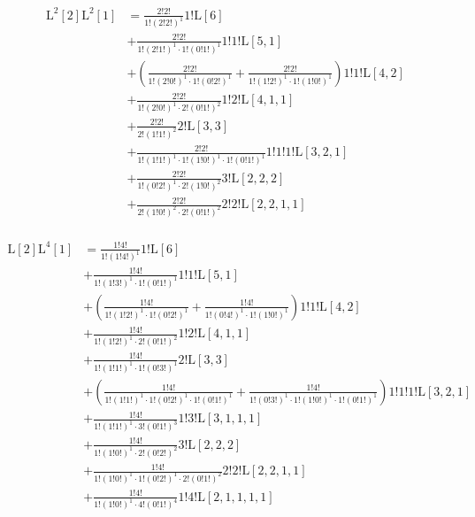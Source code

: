 \begin{equation*} \begin{aligned}
  \mathrm{L}^2[2] \mathrm{L}^2[1] &=
  \frac{2!2!}{1!(2!2!)^1}
  1! \mathrm{L}[6] \\ &
+ \frac{2!2!}{1!(2!1!)^1 \cdot 1!(0!1!)^1}
  1!1! \mathrm{L}[5, 1] \\ &
+ \left(
  \frac{2!2!}{1!(2!0!)^1 \cdot 1!(0!2!)^1}
+ \frac{2!2!}{1!(1!2!)^1 \cdot 1!(1!0!)^1}
  \right)
  1!1! \mathrm{L}[4, 2] \\ &
+ \frac{2!2!}{1!(2!0!)^1 \cdot 2!(0!1!)^2}
  1!2! \mathrm{L}[4, 1, 1] \\ &
+ \frac{2!2!}{2!(1!1!)^2}
  2! \mathrm{L}[3, 3] \\ &
+ \frac{2!2!}{1!(1!1!)^1 \cdot 1!(1!0!)^1 \cdot 1!(0!1!)^1}
  1!1!1! \mathrm{L}[3, 2, 1] \\ &
+ \frac{2!2!}{1!(0!2!)^1 \cdot 2!(1!0!)^2}
  3! \mathrm{L}[2, 2, 2] \\ &
+ \frac{2!2!}{2!(1!0!)^2 \cdot 2!(0!1!)^2}
  2!2! \mathrm{L}[2, 2, 1, 1] \\
\end{aligned} \end{equation*}

\begin{equation*} \begin{aligned}
  \mathrm{L}[2] \mathrm{L}^4[1] &=
  \frac{1!4!}{1!(1!4!)^1}
  1! \mathrm{L}[6] \\ &
+ \frac{1!4!}{1!(1!3!)^1 \cdot 1!(0!1!)^1}
  1!1! \mathrm{L}[5, 1] \\ &
+ \left(
  \frac{1!4!}{1!(1!2!)^1 \cdot 1!(0!2!)^1}
+ \frac{1!4!}{1!(0!4!)^1 \cdot 1!(1!0!)^1}
  \right)
  1!1! \mathrm{L}[4, 2] \\ &
+ \frac{1!4!}{1!(1!2!)^1 \cdot 2!(0!1!)^2}
  1!2! \mathrm{L}[4, 1, 1] \\ &
+ \frac{1!4!}{1!(1!1!)^1 \cdot 1!(0!3!)^1}
  2! \mathrm{L}[3, 3] \\ &
+ \left(
  \frac{1!4!}{1!(1!1!)^1 \cdot 1!(0!2!)^1 \cdot 1!(0!1!)^1}
+ \frac{1!4!}{1!(0!3!)^1 \cdot 1!(1!0!)^1 \cdot 1!(0!1!)^1}
  \right)
  1!1!1! \mathrm{L}[3, 2, 1] \\ &
+ \frac{1!4!}{1!(1!1!)^1 \cdot 3!(0!1!)^3}
  1!3! \mathrm{L}[3, 1, 1, 1] \\ &
+ \frac{1!4!}{1!(1!0!)^1 \cdot 2!(0!2!)^2}
  3! \mathrm{L}[2, 2, 2] \\ &
+ \frac{1!4!}{1!(1!0!)^1 \cdot 1!(0!2!)^1 \cdot 2!(0!1!)^2}
  2!2! \mathrm{L}[2, 2, 1, 1] \\ &
+ \frac{1!4!}{1!(1!0!)^1 \cdot 4!(0!1!)^4}
  1!4! \mathrm{L}[2, 1, 1, 1, 1] \\
\end{aligned} \end{equation*}

